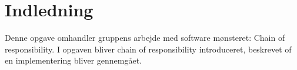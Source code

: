 \chapter{Indledning}\label{ch:introduction}
Denne opgave omhandler gruppens arbejde med software mønsteret: Chain of responsibility. I opgaven bliver chain of responsibility introduceret, beskrevet of en implementering bliver gennemgået. 